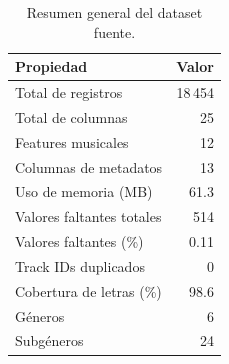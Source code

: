 \begin{table}[htbp]
\centering
\caption{Resumen general del dataset fuente.}
\label{tab:dataset_overview}
\begin{tabular}{lr}
\toprule
Propiedad & Valor \\
\midrule
Total de registros & 18\,454 \\
Total de columnas & 25 \\
Features musicales & 12 \\
Columnas de metadatos & 13 \\
Uso de memoria (MB) & 61.3 \\
\midrule
Valores faltantes totales & 514 \\
Valores faltantes (\%) & 0.11 \\
Track IDs duplicados & 0 \\
\midrule
Cobertura de letras (\%) & 98.6 \\
Géneros & 6 \\
Subgéneros & 24 \\
\bottomrule
\end{tabular}
\end{table}